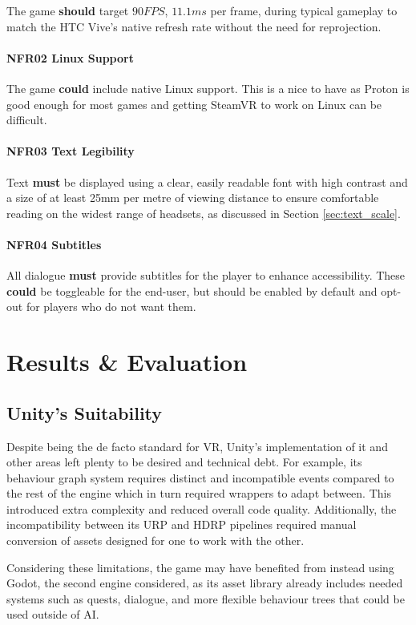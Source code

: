 \documentclass[sigconf]{acmart}
\begin{document}
The game \textbf{should} target $90FPS$, $11.1ms$ per frame, during typical
gameplay to match the HTC Vive's native refresh rate without the need for
reprojection.

\paragraph{\label{sec:nfr_linux}NFR02 Linux Support}
The game \textbf{could} include native Linux support. This is a nice to have as
Proton is good enough for most games and getting SteamVR to work on Linux can be
difficult.

\paragraph{\label{sec:nfr_text}NFR03 Text Legibility}
Text \textbf{must} be displayed using a clear, easily readable font with high
contrast and a size of at least 25mm per metre of viewing distance to ensure
comfortable reading on the widest range of headsets, as discussed in Section
\ref{sec:text_scale}.

\paragraph{\label{sec:nfr_subtitle}NFR04 Subtitles}
All dialogue \textbf{must} provide subtitles for the player to enhance accessibility.
These \textbf{could} be toggleable for the end-user, but should be enabled by default
and opt-out for players who do not want them.

\section{Results \& Evaluation}

\subsection{Unity's Suitability}
Despite being the de facto standard for VR, Unity's implementation of it and
other areas left plenty to be desired and technical debt. For example, its
behaviour graph system requires distinct and incompatible events compared to the
rest of the engine which in turn required wrappers to adapt between. This
introduced extra complexity and reduced overall code quality. Additionally, the
incompatibility between its URP and HDRP pipelines required manual conversion of
assets designed for one to work with the other.

Considering these limitations, the game may have benefited from instead using
Godot, the second engine considered, as its asset library already includes
needed systems such as quests, dialogue, and more flexible behaviour trees that
could be used outside of AI.
\end{document}
